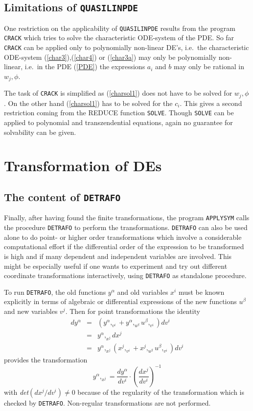\subsection{Limitations of {\tt QUASILINPDE}}
One restriction on the applicability of {\tt QUASILINPDE} results from
the program {\tt CRACK} which tries to solve the
characteristic ODE-system of the PDE. So far {\tt CRACK} can be
applied only to polynomially non-linear DE's, i.e.\ the characteristic
ODE-system (\ref{char3}),(\ref{char4}) or (\ref{char3a}) may
only be polynomially non-linear, i.e.\ in the PDE (\ref{PDE})
the expressions $a_i$ and $b$ may only be rational in $w_j,\phi$.

The task of {\tt CRACK} is simplified as (\ref{charsol1}) does not have to
be solved for $w_j, \phi$. On the other hand (\ref{charsol1}) has to be
solved for the $c_i$. This gives a
second restriction coming from the REDUCE function {\tt SOLVE}.
Though {\tt SOLVE} can be applied
to polynomial and transzendential equations, again no guarantee for
solvability can be given.
\section{Transformation of DEs}
\subsection{The content of {\tt DETRAFO}}
Finally, after having found the finite transformations,
the program {\tt APPLYSYM} calls the procedure
{\tt DETRAFO} to perform the transformations. {\tt DETRAFO}
can also be used alone to do point- or higher order transformations
which involve a considerable computational effort if the
differential order of the expression to be transformed is high and
if many dependent and independent variables are involved.
This might be especially useful if one wants to experiment
and try out different coordinate transformations interactively,
using {\tt DETRAFO} as standalone procedure.

To run {\tt DETRAFO}, the old functions $y^{\alpha}$ and old
variables $x^i$ must be
known explicitly in terms of algebraic or
differential expressions of the new functions $u^{\beta}$
and new variables $v^j$. Then for point transformations the identity
\begin{eqnarray}
dy^{\alpha} & = & \left(y^{\alpha},_{v^i} +
                  y^{\alpha},_{u^{\beta}}u^{\beta},_{v^i}\right) dv^i \\
            & = & y^{\alpha},_{x^j}dx^j  \\
            & = & y^{\alpha},_{x^j}\left(x^j,_{v^i} +
                  x^j,_{u^{\beta}}u^{\beta},_{v^i}\right) dv^i
\end{eqnarray}
provides the transformation
\begin{equation}
y^{\alpha},_{x^j} = \frac{dy^\alpha}{dv^i}\cdot
                    \left(\frac{dx^j}{dv^i}\right)^{-1}   \label{trafo}
\end{equation}
with {\it det}$\left(dx^j/dv^i\right) \neq 0$ because of the regularity
of the transformation which is checked by {\tt DETRAFO}. Non-regular
transformations are not performed.

